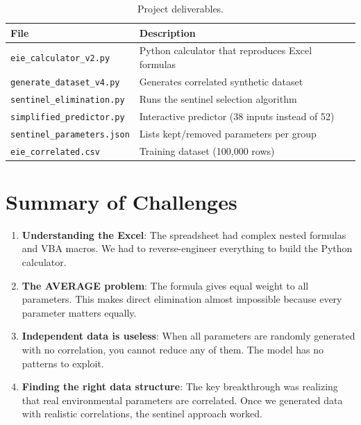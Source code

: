\documentclass[12pt,a4paper]{article}
\begin{document}
\begin{table}[H]
\centering
\begin{tabular}{lp{8cm}}
\toprule
\textbf{File} & \textbf{Description} \\
\midrule
\texttt{eie\_calculator\_v2.py} & Python calculator that reproduces Excel formulas \\
\texttt{generate\_dataset\_v4.py} & Generates correlated synthetic dataset \\
\texttt{sentinel\_elimination.py} & Runs the sentinel selection algorithm \\
\texttt{simplified\_predictor.py} & Interactive predictor (38 inputs instead of 52) \\
\texttt{sentinel\_parameters.json} & Lists kept/removed parameters per group \\
\texttt{eie\_correlated.csv} & Training dataset (100,000 rows) \\
\bottomrule
\end{tabular}
\caption{Project deliverables.}
\end{table}

\section{Summary of Challenges}

\begin{enumerate}
    \item \textbf{Understanding the Excel}: The spreadsheet had complex nested formulas and VBA macros. We had to reverse-engineer everything to build the Python calculator.
    
    \item \textbf{The AVERAGE problem}: The formula gives equal weight to all parameters. This makes direct elimination almost impossible because every parameter matters equally.
    
    \item \textbf{Independent data is useless}: When all parameters are randomly generated with no correlation, you cannot reduce any of them. The model has no patterns to exploit.
    
    \item \textbf{Finding the right data structure}: The key breakthrough was realizing that real environmental parameters are correlated. Once we generated data with realistic correlations, the sentinel approach worked.
\end{enumerate}
\end{document}

